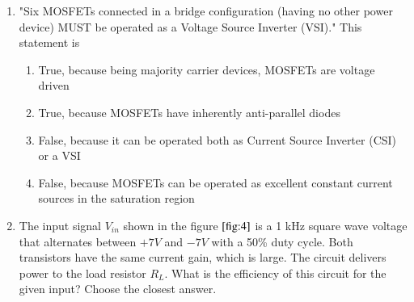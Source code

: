 \documentclass[journal]{IEEEtran}
\numberwithin{equation}{enumi}
\numberwithin{figure}{enumi}
\begin{document}
\begin{enumerate}
\item "Six MOSFETs connected in a bridge configuration (having no other power device) MUST be operated as a Voltage Source Inverter (VSI)." This statement is
\begin{enumerate}
    \item True, because being majority carrier devices, MOSFETs are voltage driven
    \item True, because MOSFETs have inherently anti-parallel diodes
    \item False, because it can be operated both as Current Source Inverter (CSI) or a VSI
    \item False, because MOSFETs can be operated as excellent constant current sources in the saturation region
\end{enumerate}
\bigskip
\item The input signal $V_{in}$ shown in the figure $\ref{fig:4}$ is a 1 kHz square wave voltage that alternates between $+7V$ and $-7V$ with a 50\% duty cycle. Both transistors have the same current gain, which is large. The circuit delivers power to the load resistor $R_L$. What is the efficiency of this circuit for the given input? Choose the closest answer.
\begin{figure}[!ht]
    \centering
\end{figure}
\end{enumerate}
\end{document}
